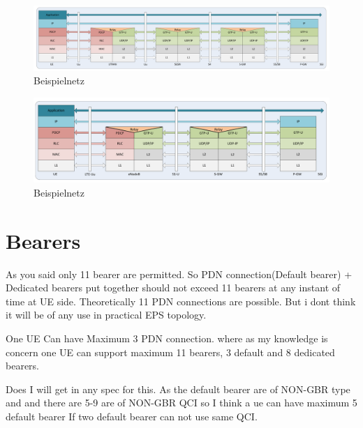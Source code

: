 \begin{figure}[htbp]
	\centering
	\includegraphics[width=1.0\textwidth]{images/3gpp/3g-userplane.pdf}
	\caption{Beispielnetz}\label{fig:3gpp-umtsuserplane}
\end{figure}

\begin{figure}[htbp]
	\centering
	\includegraphics[width=1.0\textwidth]{images/3gpp/LTE-userplane.pdf}
	\caption{Beispielnetz}\label{fig:3gpp-lteuserplane}
\end{figure}


\section{Bearers}

As you said only 11 bearer are permitted.
So PDN connection(Default bearer) + Dedicated bearers put together should not exceed 11 bearers at any instant of time at UE side.
Theoretically 11 PDN connections are possible. But i dont think it will be of any use in practical EPS topology.

One UE Can have Maximum 3 PDN connection.
where as my knowledge is concern one UE can support maximum 11 bearers, 3 default and 8 dedicated bearers.

Does I will get in any spec for this. As the default bearer are of  NON-GBR type and and there are 5-9 are of NON-GBR QCI so I think a ue can have maximum 5 default bearer If two default bearer can not use same QCI.

